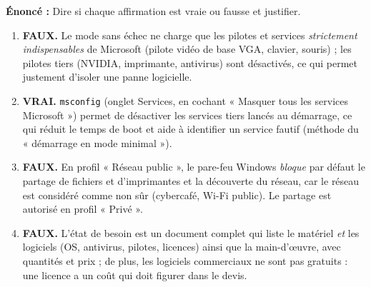 \documentclass[11pt]{article}
\newcommand{\cle}[1]{{\popxbold\color{popdark}#1}}
\begin{document}
\begin{corrige}
\textbf{Énoncé :} Dire si chaque affirmation est vraie ou fausse et justifier.
\tcblower
\begin{enumerate}
    \item \textbf{FAUX.} Le \cle{mode sans échec} ne charge que les pilotes et services \emph{strictement indispensables} de Microsoft (pilote vidéo de base VGA, clavier, souris) ; les pilotes tiers (NVIDIA, imprimante, antivirus) sont désactivés, ce qui permet justement d'isoler une panne logicielle.
    \item \textbf{VRAI.} \texttt{msconfig} (onglet Services, en cochant « Masquer tous les services Microsoft ») permet de désactiver les services tiers lancés au démarrage, ce qui réduit le temps de boot et aide à identifier un service fautif (méthode du « démarrage en mode minimal »).
    \item \textbf{FAUX.} En profil « Réseau public », le pare-feu Windows \emph{bloque} par défaut le partage de fichiers et d'imprimantes et la découverte du réseau, car le réseau est considéré comme non sûr (cybercafé, Wi-Fi public). Le partage est autorisé en profil « Privé ».
    \item \textbf{FAUX.} L'\cle{état de besoin} est un document complet qui liste le matériel \emph{et} les logiciels (OS, antivirus, pilotes, licences) ainsi que la main-d'œuvre, avec quantités et prix ; de plus, les logiciels commerciaux ne sont pas gratuits : une licence a un coût qui doit figurer dans le devis.
\end{enumerate}
\end{corrige}
\end{document}
